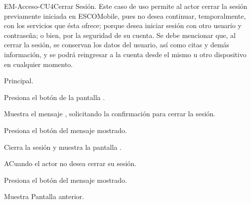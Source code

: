 
	\begin{UseCase}{EM-Acceso-CU4}{Cerrar Sesión.}{
		\noindent
		Este caso de uso permite al actor cerrar la sesión previamente iniciada en ESCOMobile, pues no desea
		continuar, temporalmente, con los servicios que ésta ofrece; porque desea iniciar sesión con otro usuario
		y contraseña; o bien, por la seguridad de su cuenta. Se debe mencionar que, al cerrar la sesión, se conservan
		los datos del usuario, así como citas y demás información, y se podrá reingresar a la cuenta desde el mismo
		u otro dispositivo en cualquier momento. 
		\newline
		}
	\end{UseCase}

	\begin{UCtrayectoria}{Principal.}

		\UCpaso[\UCactor] Presiona el botón  de la pantalla .

		\UCpaso Muestra el mensaje , solicitando la confirmación para cerrar la sesión.

		\UCpaso [\UCactor] Presiona el botón  del mensaje mostrado. 

		\UCpaso Cierra la sesión y muestra la pantalla .

	\end{UCtrayectoria}

	\begin{UCtrayectoriaA}{A}{Cuando el actor no desea cerrar su sesión.}

		\UCpaso	Presiona el botón  del mensaje mostrado.

		\UCpaso Muestra Pantalla anterior.

	\end{UCtrayectoriaA}

